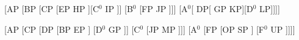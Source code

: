 \documentclass[11pt,twoside]{article}
\begin{document}
\begin{phrase string}{}
[AP [BP [CP [EP HP ][C$^{0}$ IP ]] [B$^{0}$ [FP JP ]]] [A$^{0}$[ DP[ GP KP][D$^{0}$ LP]]]]
\end{phrase string}

\begin{phrase string}{}
[AP [CP [DP [BP EP ] [D$^{0}$ GP ]] [C$^{0}$ [JP MP ]]] [A$^{0}$ [FP [OP SP ] [F$^{0}$ UP ]]]]
\end{phrase string}
\newpage

\newpage



\end{document}
